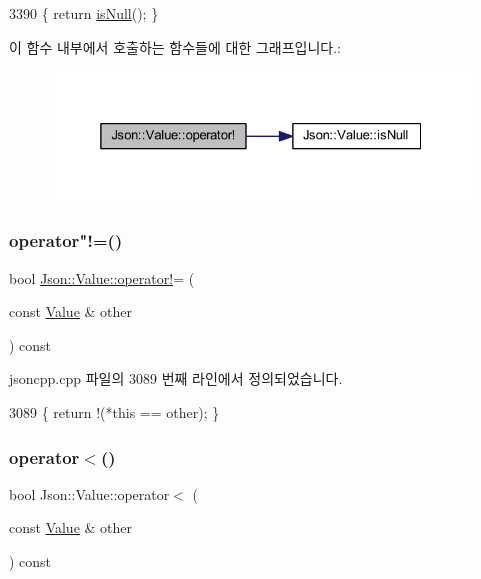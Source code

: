 \begin{DoxyCode}
3390 \{ \textcolor{keywordflow}{return} \hyperlink{class_json_1_1_value_abde4070e21e46dc4f8203f66582cb19f}{isNull}(); \}
\end{DoxyCode}
이 함수 내부에서 호출하는 함수들에 대한 그래프입니다.\+:\nopagebreak
\begin{figure}[H]
\begin{center}
\leavevmode
\includegraphics[width=325pt]{class_json_1_1_value_a731b89fb4764c39ce2328e1707c822b9_cgraph}
\end{center}
\end{figure}
\mbox{\label{class_json_1_1_value_a86e95be072e515c48abc61dec63a1689}} 
\subsubsection{\texorpdfstring{operator"!=()}{operator!=()}}
{\footnotesize\ttfamily bool \hyperlink{class_json_1_1_value_a731b89fb4764c39ce2328e1707c822b9}{Json\+::\+Value\+::operator!}= (\begin{DoxyParamCaption}\item[{const \hyperlink{class_json_1_1_value}{Value} \&}]{other }\end{DoxyParamCaption}) const}



jsoncpp.\+cpp 파일의 3089 번째 라인에서 정의되었습니다.


\begin{DoxyCode}
3089 \{ \textcolor{keywordflow}{return} !(*\textcolor{keyword}{this} == other); \}
\end{DoxyCode}
\mbox{\label{class_json_1_1_value_aac6bd14155b88ed2d39ef54820b39e49}} 
\subsubsection{\texorpdfstring{operator$<$()}{operator<()}}
{\footnotesize\ttfamily bool Json\+::\+Value\+::operator$<$ (\begin{DoxyParamCaption}\item[{const \hyperlink{class_json_1_1_value}{Value} \&}]{other }\end{DoxyParamCaption}) const}




